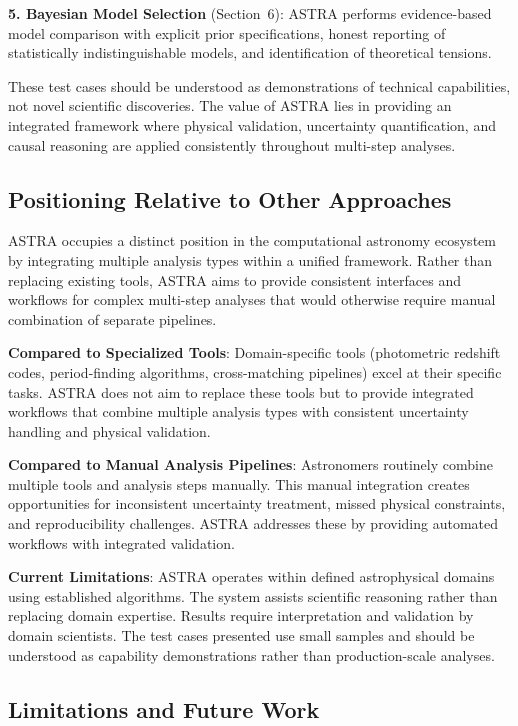 \documentclass[usenatbib]{rasti}
\begin{document}
\textbf{5. Bayesian Model Selection} (Section~6): ASTRA performs evidence-based model comparison with explicit prior specifications, honest reporting of statistically indistinguishable models, and identification of theoretical tensions.

These test cases should be understood as demonstrations of technical capabilities, not novel scientific discoveries. The value of ASTRA lies in providing an integrated framework where physical validation, uncertainty quantification, and causal reasoning are applied consistently throughout multi-step analyses.

\subsection{Positioning Relative to Other Approaches}

ASTRA occupies a distinct position in the computational astronomy ecosystem by integrating multiple analysis types within a unified framework. Rather than replacing existing tools, ASTRA aims to provide consistent interfaces and workflows for complex multi-step analyses that would otherwise require manual combination of separate pipelines.

\textbf{Compared to Specialized Tools}: Domain-specific tools (photometric redshift codes, period-finding algorithms, cross-matching pipelines) excel at their specific tasks. ASTRA does not aim to replace these tools but to provide integrated workflows that combine multiple analysis types with consistent uncertainty handling and physical validation.

\textbf{Compared to Manual Analysis Pipelines}: Astronomers routinely combine multiple tools and analysis steps manually. This manual integration creates opportunities for inconsistent uncertainty treatment, missed physical constraints, and reproducibility challenges. ASTRA addresses these by providing automated workflows with integrated validation.

\textbf{Current Limitations}: ASTRA operates within defined astrophysical domains using established algorithms. The system assists scientific reasoning rather than replacing domain expertise. Results require interpretation and validation by domain scientists. The test cases presented use small samples and should be understood as capability demonstrations rather than production-scale analyses.

\subsection{Limitations and Future Work}
\end{document}
